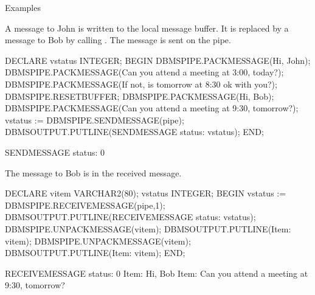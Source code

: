 \documentclass[letterpaper,10pt,english,openany,oneside]{sphinxmanual}
\begin{document}
Examples

A message to John is written to the local message buffer. It is replaced
by a message to Bob by calling . The message is sent on the
pipe.

%
\begin{sphinxVerbatim}[commandchars=\\\{\}]
DECLARE
    v\PYGZus{}status        INTEGER;
BEGIN
    DBMS\PYGZus{}PIPE.PACK\PYGZus{}MESSAGE(\PYGZsq{}Hi, John\PYGZsq{});
    DBMS\PYGZus{}PIPE.PACK\PYGZus{}MESSAGE(\PYGZsq{}Can you attend a meeting at 3:00, today?\PYGZsq{});
    DBMS\PYGZus{}PIPE.PACK\PYGZus{}MESSAGE(\PYGZsq{}If not, is tomorrow at 8:30 ok with you?\PYGZsq{});
    DBMS\PYGZus{}PIPE.RESET\PYGZus{}BUFFER;
    DBMS\PYGZus{}PIPE.PACK\PYGZus{}MESSAGE(\PYGZsq{}Hi, Bob\PYGZsq{});
    DBMS\PYGZus{}PIPE.PACK\PYGZus{}MESSAGE(\PYGZsq{}Can you attend a meeting at 9:30, tomorrow?\PYGZsq{});
    v\PYGZus{}status := DBMS\PYGZus{}PIPE.SEND\PYGZus{}MESSAGE(\PYGZsq{}pipe\PYGZsq{});
    DBMS\PYGZus{}OUTPUT.PUT\PYGZus{}LINE(\PYGZsq{}SEND\PYGZus{}MESSAGE status: \PYGZsq{} \textbar{}\textbar{} v\PYGZus{}status);
END;

SEND\PYGZus{}MESSAGE status: 0
\end{sphinxVerbatim}

The message to Bob is in the received message.

%
\begin{sphinxVerbatim}[commandchars=\\\{\}]
DECLARE
    v\PYGZus{}item          VARCHAR2(80);
    v\PYGZus{}status        INTEGER;
BEGIN
    v\PYGZus{}status := DBMS\PYGZus{}PIPE.RECEIVE\PYGZus{}MESSAGE(\PYGZsq{}pipe\PYGZsq{},1);
    DBMS\PYGZus{}OUTPUT.PUT\PYGZus{}LINE(\PYGZsq{}RECEIVE\PYGZus{}MESSAGE status: \PYGZsq{} \textbar{}\textbar{} v\PYGZus{}status);
    DBMS\PYGZus{}PIPE.UNPACK\PYGZus{}MESSAGE(v\PYGZus{}item);
    DBMS\PYGZus{}OUTPUT.PUT\PYGZus{}LINE(\PYGZsq{}Item: \PYGZsq{} \textbar{}\textbar{} v\PYGZus{}item);
    DBMS\PYGZus{}PIPE.UNPACK\PYGZus{}MESSAGE(v\PYGZus{}item);
    DBMS\PYGZus{}OUTPUT.PUT\PYGZus{}LINE(\PYGZsq{}Item: \PYGZsq{} \textbar{}\textbar{} v\PYGZus{}item);
END;

RECEIVE\PYGZus{}MESSAGE status: 0
Item: Hi, Bob
Item: Can you attend a meeting at 9:30, tomorrow?
\end{sphinxVerbatim}

\newpage
\end{document}
